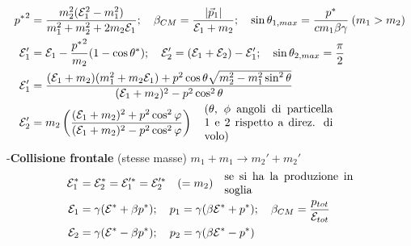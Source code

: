 \documentclass{article}
\begin{document}
\begin{minipage}[t]{.49\textwidth}
\begin{align*}
    {p^*}^2 &= \frac{m_2^2(\mathcal{E}_1^2-m_1^2)}{m_1^2+m_2^2+2m_2\mathcal{E}_1}; \quad \beta_{CM}=\frac{|\vec{p}_1|}{\mathcal{E}_1+m_2}; \quad \sin\theta_{1,max} = \frac{p^*}{c m_1 \beta \gamma}\> (m_1 > m_2)\\
    \mathcal{E}_1' &= \mathcal{E}_1 - \frac{{p^*}^2}{m_2}(1-\cos\theta^*); \quad \mathcal{E}_2' = (\mathcal{E}_1+\mathcal{E}_2)-\mathcal{E}_1'; \quad \sin\theta_{2,max} = \frac{\pi}{2}\\
    \mathcal{E}_1' &= \frac{(\mathcal{E}_1+m_2)(m_1^2+m_2\mathcal{E}_1)+p^2\cos\theta\sqrt{m_2^2-m_1^2\sin^2\theta}}{(\mathcal{E}_1+m_2)^2-p^2\cos^2\theta}\\
    \mathcal{E}_2' &= m_2 \left (\frac{(\mathcal{E}_1+m_2)^2+p^2\cos^2\varphi}{(\mathcal{E}_1+m_2)^2-p^2\cos^2\varphi} \right ) \quad \parbox{4cm}{($\theta$, $\phi$ angoli di particella $1$ e $2$ rispetto a direz. di volo)}
\end{align*}
{\center \large -\textbf{Collisione frontale} (stesse masse)} $m_1 + m_1 \to m_2' + m_2'$
\begin{align*}
    \mathcal{E}_1^* &= \mathcal{E}_2^* = \mathcal{E}_1'^* = \mathcal{E}_2'^* \quad (= m_2) \quad \parbox{4cm}{se si ha la produzione in soglia}\\
    \mathcal{E}_1 &= \gamma(\mathcal{E}^* + \beta p^*); \quad p_1 = \gamma(\beta \mathcal{E}^* + p^*); \quad \beta_{CM} = \frac{p_{tot}}{\mathcal{E}_{tot}}\\
    \mathcal{E}_2 &= \gamma(\mathcal{E}^* - \beta p^*); \quad p_2 = \gamma(\beta \mathcal{E}^* - p^*)
\end{align*}
\raggedright
\end{minipage}%
%
\clearpage%
\noindent%
\end{document}
